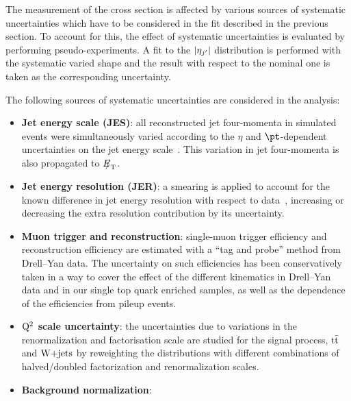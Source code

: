 The measurement of the cross section is affected by various sources of systematic uncertainties which have to be considered in the fit described in the previous section. To account for this, the effect of systematic uncertainties is evaluated by performing pseudo-experiments. A fit to the $|\eta_{j'}|$ distribution is performed with the systematic varied shape and the result with respect to the nominal one is taken as the corresponding uncertainty.

The following sources of systematic uncertainties are considered in the analysis:
\begin{itemize}
\item \textbf{Jet energy scale (JES)}: all reconstructed jet four-momenta in simulated events were simultaneously varied according to the $\eta$ and $\pt$-dependent  uncertainties on the jet energy scale~\cite{Chatrchyan:2011ds}. This variation in jet four-momenta is also propagated to ${E\!\!\!/}_{\mathrm{T}}$.
\item \textbf{Jet energy resolution (JER)}: a smearing is applied to account for the known difference in jet energy resolution with respect to data~\cite{Chatrchyan:2011ds}, increasing or decreasing the extra resolution contribution by its uncertainty.
\item \textbf{Muon trigger and reconstruction}: single-muon trigger efficiency and reconstruction efficiency are estimated with a ``tag and probe'' method from Drell--Yan data. The uncertainty on such efficiencies has been conservatively taken in a way to cover the effect of the different kinematics 
in Drell--Yan data and in our single top quark enriched samples, as well as the dependence of the efficiencies from pileup events. 
\item \textbf{$\rm Q^2$ scale uncertainty}: the uncertainties due to variations in the renormalization and factorisation scale are studied for the signal process, $\mathrm{t}\bar{\mathrm{t}}$ and $\textrm{W+jets}$ by reweighting the distributions with different combinations of halved/doubled factorization and renormalization scales.
\item \textbf{Background normalization}:

\end{itemize}
